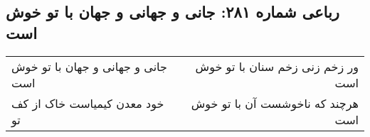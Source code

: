 \begin{center}
\section*{رباعی شماره ۲۸۱: جانی و جهانی و جهان با تو خوش است}
\label{sec:0281}
\begin{longtable}{l p{0.5cm} r}
جانی و جهانی و جهان با تو خوش است
&&
ور زخم زنی زخم سنان با تو خوش است
\\
خود معدن کیمیاست خاک از کف تو
&&
هرچند که ناخوشست آن با تو خوش است
\\
\end{longtable}
\end{center}
